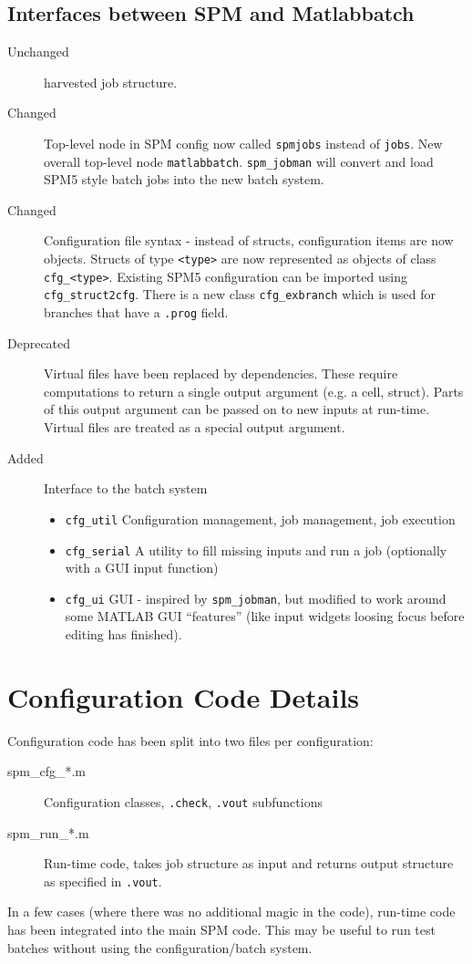 \documentclass[a4paper]{book}
\begin{document}
\subsection{Interfaces between SPM and Matlabbatch}
\label{sec:overinter}

\begin{description}
\item[Unchanged] harvested job structure.
\item[Changed] Top-level node in SPM config now called \verb|spmjobs| instead
  of \verb|jobs|. New overall top-level node
  \verb|matlabbatch|. \verb|spm_jobman| will convert and load SPM5 style batch
  jobs into the new batch system.
\item[Changed] Configuration file syntax - instead of structs, configuration
  items are now objects. Structs of type \verb|<type>| are now represented as
  objects of class \verb|cfg_<type>|. Existing SPM5 configuration can
  be imported using \verb|cfg_struct2cfg|. There is a new class
  \verb|cfg_exbranch| which is used for branches that have a \verb|.prog|
  field.
\item[Deprecated] Virtual files have been replaced by dependencies. These
  require computations to return a single output argument (e.g. a cell,
  struct). Parts of this output argument can be passed on to new inputs at
  run-time. Virtual files are treated as a special output argument.
\item[Added] Interface to the batch system
  \begin{itemize}
  \item \verb|cfg_util| Configuration management, job management, job
    execution
  \item \verb|cfg_serial| A utility to fill missing inputs and run a job
    (optionally with a GUI input function)
  \item \verb|cfg_ui| GUI - inspired by \verb|spm_jobman|, but modified to
    work around some MATLAB GUI ``features'' (like input widgets loosing focus
    before editing has finished).
  \end{itemize}

\end{description}

\section{Configuration Code Details}
\label{sec:code}

Configuration code has been split into two files per configuration:
\begin{description}
\item[spm\_cfg\_*.m] Configuration classes, \verb|.check|, \verb|.vout|
  subfunctions
\item[spm\_run\_*.m] Run-time code, takes job structure as input and returns
  output structure as specified in \verb|.vout|.
\end{description}
In a few cases (where there was no additional magic in the code), run-time
code has been integrated into the main SPM code. This may be useful to run
test batches without using the configuration/batch system.
\end{document}
